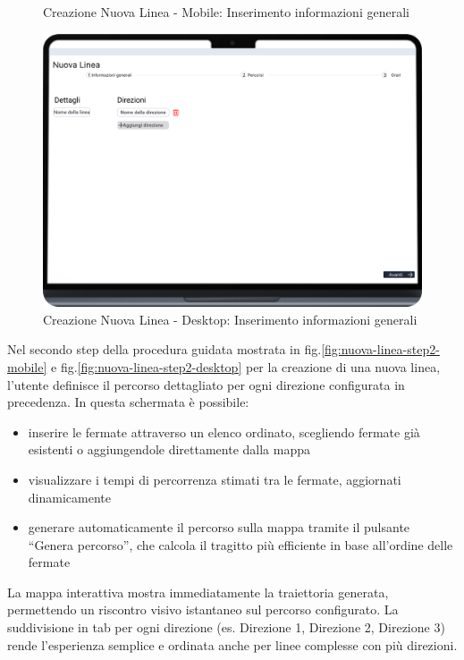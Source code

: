 \begin{figure}[H]
\begin{minipage}[b]{0.25\textwidth}
    \caption{Creazione Nuova Linea - Mobile: Inserimento informazioni generali}
    \label{fig:nuova-linea-mobile-step-1}
  \end{minipage}
  \hfill
  \begin{minipage}[b]{0.68\textwidth}
    \centering
    \includegraphics[width=\textwidth]{images/mockup/Nuova-Step1_desktop.png}
    \caption{Creazione Nuova Linea - Desktop: Inserimento informazioni generali}
    \label{fig:nuova-linea-desktop-step1}
  \end{minipage}
\end{figure}

Nel secondo step della procedura guidata mostrata in fig.\ref{fig:nuova-linea-step2-mobile} e fig.\ref{fig:nuova-linea-step2-desktop} per la creazione di una nuova linea, l’utente definisce il percorso dettagliato per ogni direzione configurata in precedenza. In questa schermata è possibile:

\begin{itemize}
    \item inserire le fermate attraverso un elenco ordinato, scegliendo fermate già esistenti o aggiungendole direttamente dalla mappa
    \item visualizzare i tempi di percorrenza stimati tra le fermate, aggiornati dinamicamente
    \item generare automaticamente il percorso sulla mappa tramite il pulsante “Genera percorso”, che calcola il tragitto più efficiente in base all’ordine delle fermate
\end{itemize}

La mappa interattiva mostra immediatamente la traiettoria generata, permettendo un riscontro visivo istantaneo sul percorso configurato. La suddivisione in tab per ogni direzione (es. Direzione 1, Direzione 2, Direzione 3) rende l’esperienza semplice e ordinata anche per linee complesse con più direzioni.

